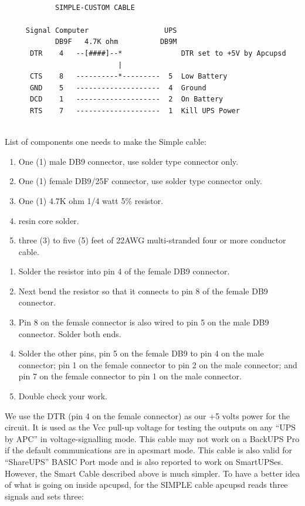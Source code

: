 {{{{{{{{{{\footnotesize
\begin{verbatim}
     
            SIMPLE-CUSTOM CABLE
     
     Signal Computer                  UPS
            DB9F   4.7K ohm          DB9M
      DTR    4   --[####]--*              DTR set to +5V by Apcupsd
                           |
      CTS    8   ----------*---------  5  Low Battery
      GND    5   --------------------  4  Ground
      DCD    1   --------------------  2  On Battery
      RTS    7   --------------------  1  Kill UPS Power
     
\end{verbatim}
\normalsize

List of components one needs to make the Simple cable:  

\begin{enumerate}
\item One (1) male DB9 connector, use solder type connector only.  
\item One (1) female DB9/25F connector, use solder type connector only.  
\item One (1) 4.7K ohm 1/4 watt 5\% resistor.  
\item resin core solder.  
\item three (3) to five (5) feet of 22AWG multi-stranded four or more
conductor cable.  
\end{enumerate}

\begin{enumerate}
\item Solder the resistor into pin 4 of the female DB9 connector.  
\item Next bend the resistor so that it connects to pin 8 of the female DB9
connector.  
\item Pin 8 on the female connector is also wired to pin 5 on the male DB9
connector. Solder both ends.  
\item Solder the other pins, pin 5 on the female DB9 to pin 4 on the male
connector; pin 1 on the female connector to pin 2 on the male connector; and
pin 7 on the female connector to pin 1 on the male connector.  
\item Double check your work.  
\end{enumerate}

We use the DTR (pin 4 on the female connector) as our +5 volts power for the
circuit. It is used as the Vcc pull-up voltage for testing the outputs on any
``UPS by APC'' in voltage-signalling mode.  This cable may not work on a
BackUPS Pro if the default communications are in apcsmart mode. This cable is
also valid for ``ShareUPS'' BASIC Port mode and is also reported to work on
SmartUPSes. However, the Smart Cable described above is much simpler. To have
a better idea of what is going on inside apcupsd, for the SIMPLE cable apcupsd
reads three signals and sets three: 

}}}}}}}}}}
